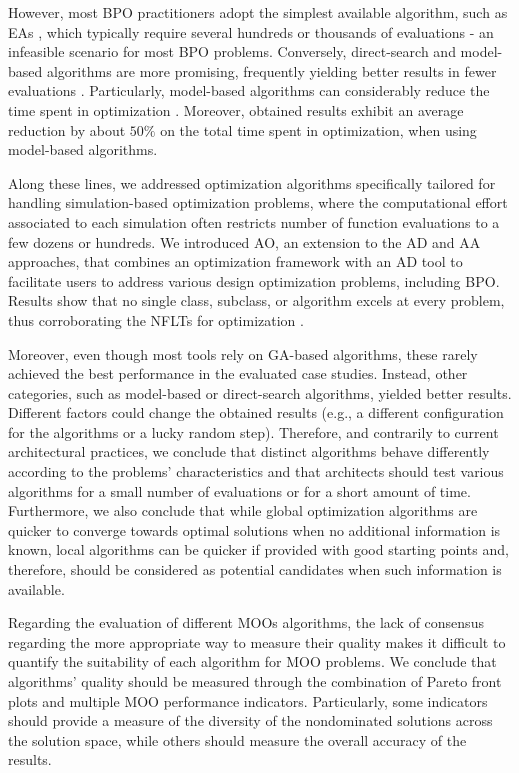 However, most \ac{BPO} practitioners adopt the simplest available algorithm, such as \acp{EA} \cite{Evins2013}, which typically require several hundreds or thousands of evaluations - an infeasible scenario for most \ac{BPO} problems. Conversely, direct-search and model-based algorithms are more promising, frequently yielding better results in fewer evaluations \cite{Waibel2018}. Particularly, model-based algorithms can considerably reduce the time spent in optimization \cite{Wortmann2017GABESTCHOICE}. Moreover, obtained results exhibit an average reduction by about $50\%$ on the total time spent in optimization, when using model-based algorithms.

Along these lines, we addressed optimization algorithms specifically tailored for handling simulation-based optimization problems, where the computational effort associated to each simulation often restricts number of function evaluations to a few dozens or hundreds. We introduced \ac{AO}, an extension to the \ac{AD} and \ac{AA} approaches, that combines an optimization framework with an \ac{AD} tool to facilitate users to address various design optimization problems, including \ac{BPO}. Results show that no single class, subclass, or algorithm excels at every problem, thus corroborating the \acp{NFLT} for optimization \cite{Wolpert1997NFLT}. 

Moreover, even though most tools rely on \ac{GA}-based algorithms, these rarely achieved the best performance in the evaluated case studies. Instead, other categories, such as model-based or direct-search algorithms, yielded better results. Different factors could change the obtained results (e.g., a different configuration for the algorithms or a lucky random step). Therefore, and contrarily to current architectural practices, we conclude that distinct algorithms behave differently according to the problems' characteristics and that architects should test various algorithms for a small number of evaluations or for a short amount of time. 
Furthermore, we also conclude that while global optimization algorithms are quicker to converge towards optimal solutions when no additional information is known, local algorithms can be quicker if provided with good starting points and, therefore, should be considered as potential candidates when such information is available.

Regarding the evaluation of different \acp{MOO} algorithms, the lack of consensus regarding the more appropriate way to measure their quality makes it difficult to quantify the suitability of each algorithm for \ac{MOO} problems. We conclude that algorithms' quality should be measured through the combination of Pareto front plots and multiple \ac{MOO} performance indicators. Particularly, some indicators should provide a measure of the diversity of the nondominated solutions across the solution space, while others should measure the overall accuracy of the results.

